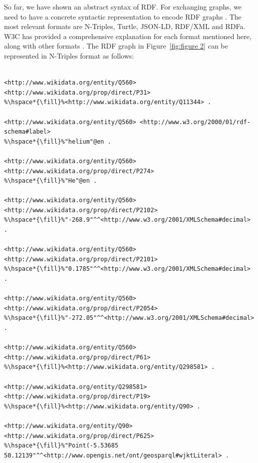 \documentclass[12 pt, a4paper]{report}
\theoremstyle{definition}
\begin{document}
So far, we have shown an abstract syntax of RDF. For exchanging graphs, we need to have a concrete syntactic representation to encode RDF graphs \cite{Kroetzsch2020}. The most relevant formats are N-Triples, Turtle, JSON-LD, RDF/XML and RDFa. W3C has provided a comprehensive explanation for each format mentioned here, along with other formats \cite{2011}. The RDF graph in Figure~\ref{fig:figure 2} can be represented in N-Triples format as follows:

\begin{minipage}{\linewidth}
\begin{lstlisting}

<http://www.wikidata.org/entity/Q560> <http://www.wikidata.org/prop/direct/P31> 
%\hspace*{\fill}%<http://www.wikidata.org/entity/Q11344> .

<http://www.wikidata.org/entity/Q560> <http://www.w3.org/2000/01/rdf-schema#label> 
%\hspace*{\fill}%"helium"@en .

<http://www.wikidata.org/entity/Q560> <http://www.wikidata.org/prop/direct/P274> 
%\hspace*{\fill}%"He"@en .

<http://www.wikidata.org/entity/Q560>  <http://www.wikidata.org/prop/direct/P2102> 
%\hspace*{\fill}%"-268.9"^^<http://www.w3.org/2001/XMLSchema#decimal> .

<http://www.wikidata.org/entity/Q560> <http://www.wikidata.org/prop/direct/P2101> 
%\hspace*{\fill}%"0.1785"^^<http://www.w3.org/2001/XMLSchema#decimal> .

<http://www.wikidata.org/entity/Q560> <http://www.wikidata.org/prop/direct/P2054> 
%\hspace*{\fill}%"-272.05"^^<http://www.w3.org/2001/XMLSchema#decimal> .

<http://www.wikidata.org/entity/Q560> <http://www.wikidata.org/prop/direct/P61> 
%\hspace*{\fill}%<http://www.wikidata.org/entity/Q298581> .

<http://www.wikidata.org/entity/Q298581> <http://www.wikidata.org/prop/direct/P19> 
%\hspace*{\fill}%<http://www.wikidata.org/entity/Q90> .

<http://www.wikidata.org/entity/Q90> <http://www.wikidata.org/prop/direct/P625> 
%\hspace*{\fill}%"Point(-5.53685 50.12139"^^<http://www.opengis.net/ont/geosparql#wjktLiteral> . 

\end{lstlisting}
\end{minipage}
\end{document}
